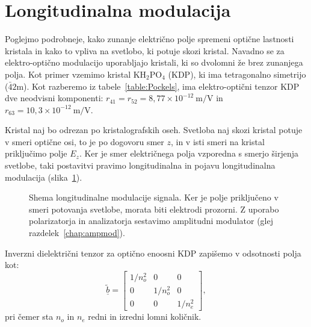 \section{Longitudinalna modulacija}
Poglejmo podrobneje, kako zunanje električno polje spremeni optične lastnosti 
kristala in kako to vpliva na svetlobo, ki potuje skozi kristal.
Navadno se za elektro-optično modulacijo 
uporabljajo kristali, ki so dvolomni že brez zunanjega polja. 
Kot primer vzemimo kristal KH$_{2}$PO$_{4}$ (KDP), ki ima tetragonalno 
simetrijo ($\bar{4}2$m). Kot razberemo iz tabele~\ref{table:Pockels}, ima 
elektro-optični tenzor KDP dve neodvisni komponenti: $r_{41} = r_{52}=8,77 \times 10^{-12}~\si{\m/\V}$
in $r_{63}= 10,3 \times 10^{-12}~\si{\m/\V}$.

Kristal naj bo odrezan po kristalografskih oseh. Svetloba naj skozi kristal potuje 
v smeri optične osi, to je po dogovoru smer $z$, in v isti smeri na kristal priključimo
polje $E_z$. Ker je smer električnega polja vzporedna s smerjo širjenja svetlobe, taki 
postavitvi pravimo longitudinalna in pojavu longitudinalna 
modulacija (slika~\ref{fig:amshema}). 
\begin{figure}[ht]
\centering
\def\svgwidth{80truemm} 

\caption{Shema longitudinalne modulacije signala. Ker je polje priključeno v smeri
potovanja svetlobe, morata biti elektrodi prozorni. Z uporabo polarizatorja in 
analizatorja sestavimo amplitudni modulator (glej razdelek~\ref{chap:ampmod}).}
\label{fig:amshema}
\end{figure}

Inverzni dielektrični tenzor za optično enoosni KDP zapišemo v odsotnosti polja kot:
\begin{equation}
\underline{\tilde{b}} = 
\left[\begin{array}{ccc}
1/n_o^2 & 0& 0\\
0 & 1/n_o^2& 0\\
0 & 0&  1/n_e^2
\end{array}\right]\!\!,
\label{7.8}
\end{equation}
pri čemer sta $n_o$ in $n_e$ redni in izredni lomni količnik. 

